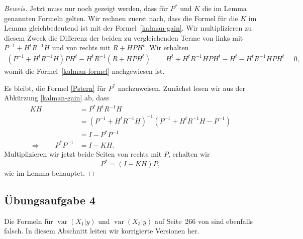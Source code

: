 \begin{proof}[Beweis]
Jetzt muss nur noch gezeigt werden, dass für $P^*$ und $K$ die im Lemma
genannten Formeln gelten.
Wir rechnen zuerst nach, dass die Formel für die $K$ im Lemma gleichbedeutend
ist mit der Formel~\eqref{kalman-gain}.
Wir multiplizieren zu diesem Zweck die Differenz der beiden zu vergleichenden
Terme von links mit
$P^{-1}+H^tR^{-1}H$
und von rechts mit $R+HPH^t$.
Wir erhalten
\begin{align*}
(P^{-1}+H^tR^{-1}H)PH^t
-
H^tR^{-1}(R+HPH^t)
&=
H^t + H^tR^{-1}HPH^t
- H^t - H^tR^{-1}HPH^t
=0,
\end{align*}
womit die Formel~\eqref{kalman-formel} nachgewiesen ist.

Es bleibt, die Formel \eqref{Pstern} für $P^*$ nachzuweisen.
Zunächst lesen wir aus der Abkürzung \eqref{kalman-gain} ab, dass
\begin{align*}
KH
&=
P^*
H^tR^{-1}H
\\
&=
(P^{-1}+H^tR^{-1}H)^{-1}(P^{-1}
+H^tR^{-1}H
-P^{-1}
)
\\
&=
I- P^* P^{-1}
\\
\Rightarrow\qquad
P^*P^{-1}&=I-KH.
\end{align*}
Multiplizieren wir jetzt beide Seiten von rechts mit $P$, erhalten wir
\[
P^*
=
(I-KH)P,
\]
wie im Lemma behauptet.
\end{proof}

\subsection{Übungsaufgabe 4\label{subsection:aufgabe4}}
Die Formeln für
$\operatorname{var}(X_1|y)$
und
$\operatorname{var}(X_3|y)$
auf Seite~266 von \cite{skript:kaperengler} sind ebenfalls falsch.
In diesem Abschnitt leiten wir korrigierte Versionen her.

